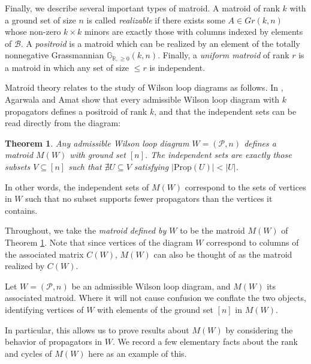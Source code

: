 \documentclass[11pt]{article}
\newcommand{\R}{\mathbb{R}}
\newcommand{\Gr}{\mathbb{G}_{\R, \geq 0}}
\newcommand{\cP}{\mathcal{P}}
\newcommand{\cB}{\mathcal{B}}
\newcommand{\Prop}{\textrm{Prop}}
\newtheorem{thm}{Theorem}[section]
\theoremstyle{remark}
\theoremstyle{definition}
\begin{document}
Finally, we describe several important types of matroid. A matroid of rank $k$ with a ground set of size $n$ is called {\em realizable} if there exists some $A \in Gr(k,n)$ whose non-zero $k\times k$ minors are exactly those with columns indexed by elements of $\cB$. A {\em positroid} is a matroid which can be realized by an element of the totally nonnegative Grassmannian $\Gr(k,n)$. Finally, a {\em uniform matroid} of rank $r$ is a matroid in which any set of size $\leq r$ is independent.


Matroid theory relates to the study of Wilson loop diagrams as follows. In \cite{wilsonloop}, Agarwala and Amat show that every admissible Wilson loop diagram with $k$ propagators defines a positroid of rank $k$, and that the independent sets can be read directly from the diagram:

\begin{thm} \label{thm WLD defines matroid} \cite[Theorem 3.6]{wilsonloop} Any admissible Wilson loop diagram $W =(\cP, n)$ defines a matroid $M(W)$ with ground set $[n]$. The independent sets are exactly those subsets $V \subseteq [n]$ such that $\nexists U\subseteq V$ satisfying $|\Prop(U)| < |U|$. \label{thm:WLDmatroid}\end{thm}
In other words, the independent sets of $M(W)$ correspond to the sets of vertices in $W$ such that no subset supports fewer propagators than the vertices it contains.

Throughout, we take the {\em matroid defined by $W$} to be the matroid $M(W)$ of Theorem \ref{thm WLD defines matroid}. Note that since vertices of the diagram $W$ correspond to columns of the associated matrix $C(W)$, $M(W)$ can also be thought of as the matroid realized by $C(W)$. 




Let $W = (\cP,n)$ be an admissible Wilson loop diagram, and $M(W)$ its associated matroid. Where it will not cause confusion we conflate the two objects, identifying vertices of $W$ with elements of the ground set $[n]$ in $M(W)$. 

In particular, this allows us to prove results about $M(W)$ by considering the behavior of propagators in $W$. We record a few elementary facts about the rank and cycles of $M(W)$ here as an example of this.
\end{document}
